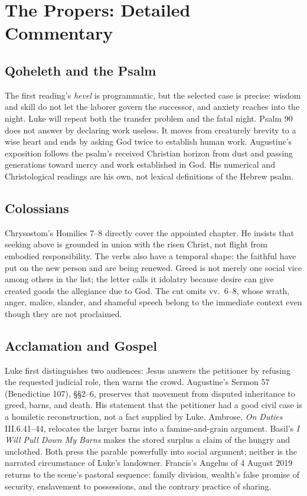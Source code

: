 \section*{The Propers: Detailed Commentary}
\subsection*{Qoheleth and the Psalm}
The first reading's \emph{hevel} is programmatic, but the selected case is
precise: wisdom and skill do not let the laborer govern the successor, and
anxiety reaches into the night. Luke will repeat both the transfer problem and
the fatal night. Psalm 90 does not answer by declaring work useless. It moves
from creaturely brevity to a wise heart and ends by asking God twice to
establish human work. Augustine's exposition follows the psalm's received
Christian horizon from dust and passing generations toward mercy and work
established in God. His numerical and Christological readings are his own,
not lexical definitions of the Hebrew psalm.
\subsection*{Colossians}
Chrysostom's Homilies 7--8 directly cover the appointed chapter. He insists
that seeking above is grounded in union with the risen Christ, not flight from
embodied responsibility. The verbs also have a temporal shape: the faithful
have put on the new person and are being renewed. Greed is not merely one
social vice among others in the list; the letter calls it idolatry because
desire can give created goods the allegiance due to God. The cut omits
vv.~6--8, whose wrath, anger, malice, slander, and shameful speech belong to
the immediate context even though they are not proclaimed.
\subsection*{Acclamation and Gospel}
Luke first distinguishes two audiences: Jesus answers the petitioner by
refusing the requested judicial role, then warns the crowd. Augustine's
Sermon 57 (Benedictine 107), §§2--6, preserves that movement from disputed
inheritance to greed, barns, and death. His statement that the petitioner had
a good civil case is a homiletic reconstruction, not a fact supplied by Luke.
Ambrose, \emph{On Duties} III.6.41--44, relocates the larger barns into a
famine-and-grain argument. Basil's \emph{I Will Pull Down My Barns} makes the
stored surplus a claim of the hungry and unclothed. Both press the parable powerfully into social argument; neither is the
narrated circumstance of Luke's landowner.
Francis's Angelus of 4 August 2019 returns to the scene's pastoral sequence:
family division, wealth's false promise of security, enslavement to
possessions, and the contrary practice of sharing.

